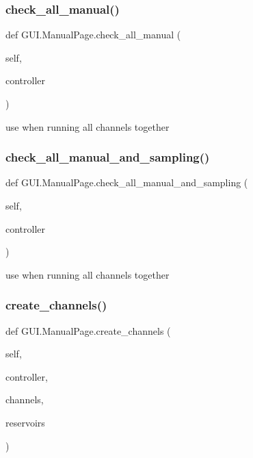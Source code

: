 \subsubsection{\texorpdfstring{check\_all\_manual()}{check\_all\_manual()}}
{\footnotesize\ttfamily def G\+U\+I.\+Manual\+Page.\+check\+\_\+all\+\_\+manual (\begin{DoxyParamCaption}\item[{}]{self,  }\item[{}]{controller }\end{DoxyParamCaption})}

\begin{DoxyVerb}use when running all channels together
\end{DoxyVerb}
 \mbox{\label{class_g_u_i_1_1_manual_page_a4c34ad73eebd301c4981a02cf4e56daa}} 
\subsubsection{\texorpdfstring{check\_all\_manual\_and\_sampling()}{check\_all\_manual\_and\_sampling()}}
{\footnotesize\ttfamily def G\+U\+I.\+Manual\+Page.\+check\+\_\+all\+\_\+manual\+\_\+and\+\_\+sampling (\begin{DoxyParamCaption}\item[{}]{self,  }\item[{}]{controller }\end{DoxyParamCaption})}

\begin{DoxyVerb}use when running all channels together
\end{DoxyVerb}
 \mbox{\label{class_g_u_i_1_1_manual_page_adaf2d13de11696b3803b541dfcc47f61}} 
\subsubsection{\texorpdfstring{create\_channels()}{create\_channels()}}
{\footnotesize\ttfamily def G\+U\+I.\+Manual\+Page.\+create\+\_\+channels (\begin{DoxyParamCaption}\item[{}]{self,  }\item[{}]{controller,  }\item[{}]{channels,  }\item[{}]{reservoirs }\end{DoxyParamCaption})}

